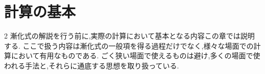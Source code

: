 
\chapter{計算の基本}
\begin{multicols*}{2}
  漸化式の解説を行う前に,実際の計算において基本となる内容この章では説明する.
  ここで扱う内容は漸化式の一般項を得る過程だけでなく,様々な場面での計算において有用なものである.
  ごく狭い場面で使えるものは避け,多くの場面で使われる手法と,それらに通底する思想を取り扱っている.







\end{multicols*}
